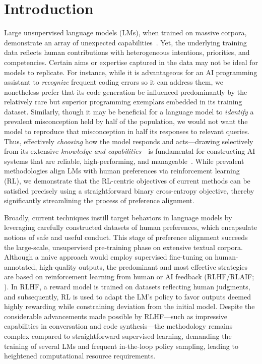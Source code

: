 \section{Introduction}
Large unsupervised language models (LMs), when trained on massive corpora, demonstrate an array of unexpected capabilities~\citep{chowdhery2022palm, brown2020language, touvron2023llama, bubeck2023sparks}. Yet, the underlying training data reflects human contributions with heterogeneous intentions, priorities, and competencies. Certain aims or expertise captured in the data may not be ideal for models to replicate. For instance, while it is advantageous for an AI programming assistant to \textit{recognize} frequent coding errors so it can address them, we nonetheless prefer that its code generation be influenced predominantly by the relatively rare but superior programming exemplars embedded in its training dataset. Similarly, though it may be beneficial for a language model to \textit{identify} a prevalent misconception held by half of the population, we would not want the model to reproduce that misconception in half its responses to relevant queries. Thus, effectively \emph{choosing} how the model responds and acts—drawing selectively from its extensive \textit{knowledge and capabilities}—is fundamental for constructing AI systems that are reliable, high-performing, and manageable~\citep{ouyang2022training}. While prevalent methodologies align LMs with human preferences via reinforcement learning (RL), we demonstrate that the RL-centric objectives of current methods can be satisfied precisely using a straightforward binary cross-entropy objective, thereby significantly streamlining the process of preference alignment.

Broadly, current techniques instill target behaviors in language models by leveraging carefully constructed datasets of human preferences, which encapsulate notions of safe and useful conduct. This stage of preference alignment succeeds the large-scale, unsupervised pre-training phase on extensive textual corpora. Although a naive approach would employ supervised fine-tuning on human-annotated, high-quality outputs, the predominant and most effective strategies are based on reinforcement learning from human or AI feedback (RLHF/RLAIF; \citep{christiano2017deep,bai2022constitutional}). In RLHF, a reward model is trained on datasets reflecting human judgments, and subsequently, RL is used to adapt the LM’s policy to favor outputs deemed highly rewarding while constraining deviation from the initial model. Despite the considerable advancements made possible by RLHF—such as impressive capabilities in conversation and code synthesis—the methodology remains complex compared to straightforward supervised learning, demanding the training of several LMs and frequent in-the-loop policy sampling, leading to heightened computational resource requirements.

